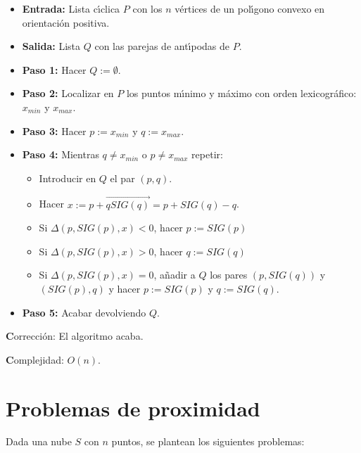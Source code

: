 \documentclass[ebook,oneside]{memoir}
\begin{document}
\begin{itemize}
  \item\textbf{Entrada:} Lista c\'{\i}clica $P$ con los $n$ v\'{e}rtices de un pol\'{\i}gono
convexo en orientaci\'{o}n positiva.
  \item\textbf{Salida:} Lista $Q$ con las parejas de ant\'{\i}podas de $P$.
  \item\textbf{Paso 1:} Hacer $Q:=\emptyset$.
  \item\textbf{Paso 2:} Localizar en $P$ los puntos m\'{\i}nimo y m\'{a}ximo con orden
lexicogr\'{a}fico: $x_{min}$ y $x_{max}$.
  \item\textbf{Paso 3:} Hacer $p:=x_{min}$ y $q:=x_{max}$.
  \item\textbf{Paso 4:} Mientras $q\neq x_{min}$ o $p\neq x_{max}$ repetir:
\begin{itemize}
  \item Introducir en $Q$ el par $(p,q)$.
  \item Hacer $x:=p+\overrightarrow{qSIG(q)}=p+SIG(q)-q$.
  \item Si $\Delta(p,SIG(p),x)<0$, hacer $p:=SIG(p)$
  \item Si $\Delta(p,SIG(p),x)>0$, hacer $q:=SIG(q)$
  \item Si $\Delta(p,SIG(p),x)=0$, a\~{n}adir a $Q$ los pares $(p,SIG(q))$ y
$(SIG(p),q)$ y hacer $p:=SIG(p)$ y $q:=SIG(q)$.
\end{itemize}
  \item\textbf{Paso 5:} Acabar devolviendo $Q$.
\end{itemize}

{\textbf Correcci\'{o}n:} El algoritmo acaba.

{\textbf Complejidad:} $O(n)$.

\section{Problemas de proximidad}

Dada una nube $S$ con $n$ puntos, se plantean los si\-guien\-tes
problemas:
\end{document}

